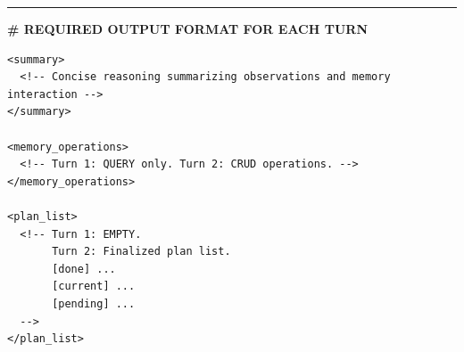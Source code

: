 \begin{tcolorbox}
\noindent\rule{\linewidth}{0.4pt}

\textbf{\# REQUIRED OUTPUT FORMAT FOR EACH TURN}

\begin{verbatim}
<summary>
  <!-- Concise reasoning summarizing observations and memory interaction -->
</summary>

<memory_operations>
  <!-- Turn 1: QUERY only. Turn 2: CRUD operations. -->
</memory_operations>

<plan_list>
  <!-- Turn 1: EMPTY.
       Turn 2: Finalized plan list.
       [done] ...
       [current] ...
       [pending] ...
  -->
</plan_list>
\end{verbatim}

\end{tcolorbox}










